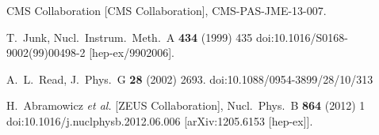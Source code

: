   CMS Collaboration [CMS Collaboration],
  CMS-PAS-JME-13-007.


  T.~Junk,
  Nucl.\ Instrum.\ Meth.\ A {\bf 434} (1999) 435
  doi:10.1016/S0168-9002(99)00498-2
  [hep-ex/9902006].
  
  A.~L.~Read,
  J.\ Phys.\ G {\bf 28} (2002) 2693.
  doi:10.1088/0954-3899/28/10/313

  H.~Abramowicz {\it et al.} [ZEUS Collaboration],
  Nucl.\ Phys.\ B {\bf 864} (2012) 1
  doi:10.1016/j.nuclphysb.2012.06.006
  [arXiv:1205.6153 [hep-ex]].
